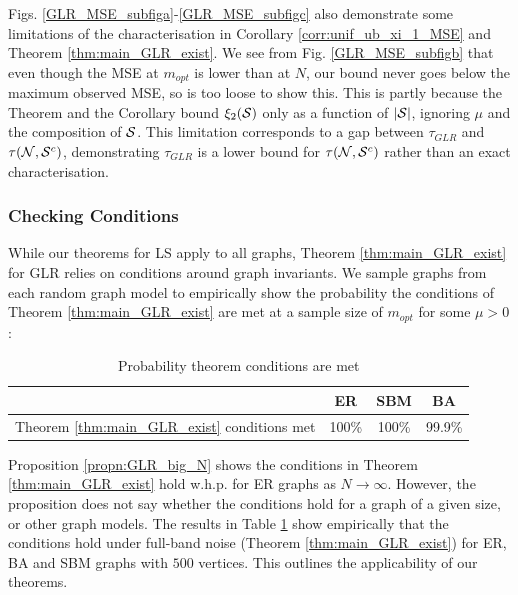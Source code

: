 Figs. \ref{GLR_MSE_subfiga}-\ref{GLR_MSE_subfigc} also demonstrate some limitations of the characterisation in Corollary \ref{corr:unif_ub_xi_1_MSE} and Theorem \ref{thm:main_GLR_exist}. We see from Fig. \ref{GLR_MSE_subfigb} that even though the MSE at $m_{opt}$ is lower than at $N$, our bound never goes below the maximum observed MSE, so is too loose to show this. This is partly because the Theorem and the Corollary bound $\xi_{2}(\mathcal{S})$ only as a function of $|\mathcal{S}|$, ignoring $\mu$ and the composition of $\mathcal{S}$. This limitation corresponds to a gap between $\tau_{GLR}$ and $\tau(\mathcal{N},\mathcal{S}^{c})$, demonstrating $\tau_{GLR}$ is a lower bound for $\tau(\mathcal{N},\mathcal{S}^{c})$ rather than an exact characterisation.


\subsubsection{Checking Conditions}
While our theorems for LS apply to all graphs, Theorem \ref{thm:main_GLR_exist} for GLR relies on conditions around graph invariants. We sample graphs from each random graph model to empirically show the probability the conditions of Theorem \ref{thm:main_GLR_exist} are met at a sample size of $m_{opt}$ for some $\mu > 0$:

\begin{table}[h!]
\caption{Probability theorem conditions are met}
    \begin{center}
        \begin{tabular}{lccc}
        \toprule
        & \textbf{ER} & \textbf{SBM} & \textbf{BA} \\ 
        \midrule
        Theorem \ref{thm:main_GLR_exist} conditions met & 100\% & 100\% & 99.9\% \\ 
        \bottomrule
        \end{tabular}
    \end{center}
    \label{tbl:empirical_probabilities_conditions}
\end{table}

Proposition \ref{propn:GLR_big_N} shows the conditions in Theorem \ref{thm:main_GLR_exist} hold w.h.p. for ER graphs as $N \to \infty$. However, the proposition does not say whether the conditions hold for a graph of a given size, or other graph models. The results in Table \ref{tbl:empirical_probabilities_conditions} show empirically that the conditions hold under full-band noise (Theorem \ref{thm:main_GLR_exist}) for ER, BA and SBM graphs with $500$ vertices. This outlines the applicability of our theorems.

